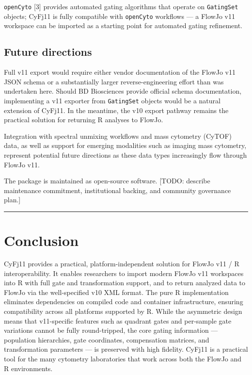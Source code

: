 \documentclass[
]{article}
\begin{document}
\texttt{openCyto} {[}3{]} provides automated gating algorithms that
operate on \texttt{GatingSet} objects; CyFj11 is fully compatible with
\texttt{openCyto} workflows --- a FlowJo v11 workspace can be imported
as a starting point for automated gating refinement.

\subsection{Future directions}\label{future-directions}

Full v11 export would require either vendor documentation of the FlowJo
v11 JSON schema or a substantially larger reverse-engineering effort
than was undertaken here. Should BD Biosciences provide official schema
documentation, implementing a v11 exporter from \texttt{GatingSet}
objects would be a natural extension of CyFj11. In the meantime, the v10
export pathway remains the practical solution for returning R analyses
to FlowJo.

Integration with spectral unmixing workflows and mass cytometry (CyTOF)
data, as well as support for emerging modalities such as imaging mass
cytometry, represent potential future directions as these data types
increasingly flow through FlowJo v11.

The package is maintained as open-source software.
\textcolor{pending}{[TODO: describe maintenance commitment, institutional backing, and community governance plan.]}

\begin{center}\rule{0.5\linewidth}{0.5pt}\end{center}

\section{Conclusion}\label{conclusion}

CyFj11 provides a practical, platform-independent solution for FlowJo
v11 / R interoperability. It enables researchers to import modern FlowJo
v11 workspaces into R with full gate and transformation support, and to
return analyzed data to FlowJo via the well-specified v10 XML format.
The pure R implementation eliminates dependencies on compiled code and
container infrastructure, ensuring compatibility across all platforms
supported by R. While the asymmetric design means that v11-specific
features such as quadrant gates and per-sample gate variations cannot be
fully round-tripped, the core gating information --- population
hierarchies, gate coordinates, compensation matrices, and transformation
parameters --- is preserved with high fidelity. CyFj11 is a practical
tool for the many cytometry laboratories that work across both the
FlowJo and R environments.
\end{document}
